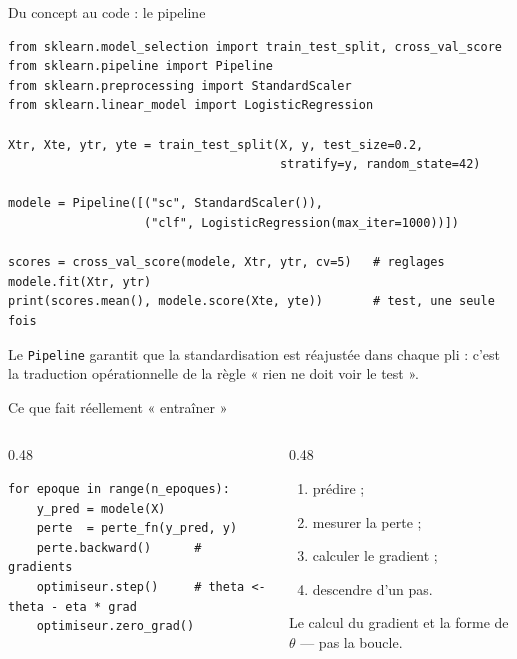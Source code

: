 \begin{frame}[fragile]{Du concept au code : le pipeline}
\begin{codebox}
\begin{lstlisting}
from sklearn.model_selection import train_test_split, cross_val_score
from sklearn.pipeline import Pipeline
from sklearn.preprocessing import StandardScaler
from sklearn.linear_model import LogisticRegression

Xtr, Xte, ytr, yte = train_test_split(X, y, test_size=0.2,
                                      stratify=y, random_state=42)

modele = Pipeline([("sc", StandardScaler()),
                   ("clf", LogisticRegression(max_iter=1000))])

scores = cross_val_score(modele, Xtr, ytr, cv=5)   # reglages
modele.fit(Xtr, ytr)
print(scores.mean(), modele.score(Xte, yte))       # test, une seule fois
\end{lstlisting}
\end{codebox}
\vspace{1mm}
{\footnotesize Le \texttt{Pipeline} garantit que la standardisation est
réajustée dans chaque pli : c'est la traduction opérationnelle de la règle
« rien ne doit voir le test ».
}
\end{frame}

\begin{frame}[fragile]{Ce que fait réellement « entraîner »}
\begin{columns}[t]
\begin{column}{0.48\textwidth}
\begin{codebox}
\begin{lstlisting}
for epoque in range(n_epoques):
    y_pred = modele(X)
    perte  = perte_fn(y_pred, y)
    perte.backward()      # gradients
    optimiseur.step()     # theta <- theta - eta * grad
    optimiseur.zero_grad()
\end{lstlisting}
\end{codebox}
\end{column}
\begin{column}{0.48\textwidth}
\begin{kbox}
\begin{enumerate}
  \item prédire ;
  \item mesurer la perte ;
  \item calculer le gradient ;
  \item descendre d'un pas.
\end{enumerate}
\end{kbox}
\begin{wbox}
Le calcul du gradient et la forme de $\theta$ --- pas la boucle.
\end{wbox}
\end{column}
\end{columns}
\end{frame}

